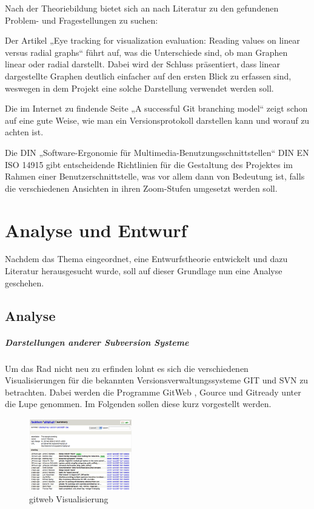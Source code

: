 \documentclass[color, ddc]{tudscrreprt}
\begin{document}
Nach der Theoriebildung bietet sich an nach Literatur zu den gefundenen Problem- und Fragestellungen zu suchen:

Der Artikel „Eye tracking for visualization evaluation: Reading values on linear versus radial graphs“ \cite{goldberg:visualization-evaluation} führt auf, was die Unterschiede sind, ob man Graphen linear oder radial darstellt. Dabei wird der Schluss präsentiert, dass linear dargestellte Graphen deutlich einfacher auf den ersten Blick zu erfassen sind, weswegen in dem Projekt eine solche Darstellung verwendet werden soll.

Die im Internet zu findende Seite „A successful Git branching model“ \cite{driessen:branching-model} zeigt schon auf eine gute Weise, wie man ein Versionsprotokoll darstellen kann und worauf zu achten ist.

Die DIN „Software-Ergonomie für Multimedia-Benutzungsschnittstellen“ DIN EN ISO 14915 \cite{DIN:EN-ISO-14915-1} \cite{DIN:EN-ISO-14915-2} \cite{DIN:EN-ISO-14915-3} gibt entscheidende Richtlinien für die Gestaltung des Projektes im Rahmen einer Benutzerschnittstelle, was vor allem dann von Bedeutung ist, falls die verschiedenen Ansichten in ihren Zoom-Stufen umgesetzt werden soll.
    
\chapter{Analyse und Entwurf}

Nachdem das Thema eingeordnet, eine Entwurfstheorie entwickelt und dazu Literatur herausgesucht wurde, soll auf dieser Grundlage nun eine Analyse geschehen.

\section{Analyse}

\paragraph{Darstellungen anderer Subversion Systeme} Um das Rad nicht neu zu erfinden lohnt es sich die verschiedenen Visualisierungen für die bekannten Versionsverwaltungssysteme GIT und SVN zu betrachten. Dabei werden die Programme GitWeb \cite{url:git}, Gource \cite{url:svn-gource} und Gitready \cite{url:gitready} unter die Lupe genommen. Im Folgenden sollen diese kurz vorgestellt werden.
\begin{figure}[ht!]
\centering
\includegraphics[width=0.4\textwidth]{Skizzen/gitweb.png}
\caption{gitweb Visualisierung}
\label{gitweb-img}
\end{figure}
\end{document}
